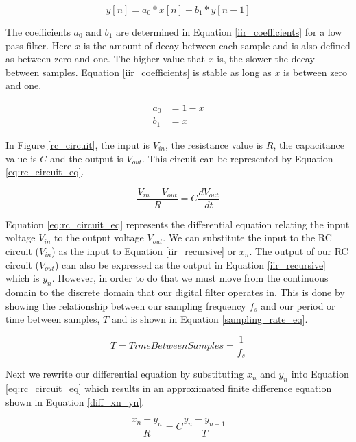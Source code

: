 \begin{equation}\label{iir_recursive}
y[n] = a_0 * x[n] + b_1 * y[n-1]
\end{equation}

The coefficients $a_0$ and $b_1$ are determined in Equation \ref{iir_coefficients} for a low pass filter.  Here $x$ is the amount of decay between each sample and is also defined as between zero and one.  The higher value that $x$ is, the slower the decay between samples.  Equation \ref{iir_coefficients} is stable as long as $x$ is between zero and one.

\begin{align}\label{iir_coefficients}
a_0 &= 1 - x \\
b_1 &= x
\end{align}

In Figure \ref{rc_circuit}, the input is $V_{in}$, the resistance value is $R$, the capacitance value is $C$ and the output is $V_{out}$.  This circuit can be represented by Equation \ref{eq:rc_circuit_eq}.

\begin{equation}\label{eq:rc_circuit_eq}
\frac{V_{in}-V_{out}}{R}=C\frac{dV_{out}}{dt}
\end{equation}

Equation \ref{eq:rc_circuit_eq} represents the differential equation relating the input voltage $V_{in}$ to the output voltage $V_{out}$.  We can substitute the input to the RC circuit ($V_{in}$) as the input to Equation \ref{iir_recursive} or $x_n$.  The output of our RC circuit ($V_{out}$) can also be expressed as the output in Equation \ref{iir_recursive} which is $y_n$.  However, in order to do that we must move from the continuous domain to the discrete domain that our digital filter operates in.  This is done by showing the relationship between our sampling frequency $f_s$ and our period or time between samples, $T$ and is shown in Equation \ref{sampling_rate_eq}.

\begin{equation}\label{sampling_rate_eq}
T=Time Between Samples=\frac{1}{f_s}
\end{equation}

Next we rewrite our differential equation by substituting $x_n$ and $y_n$ into Equation \ref{eq:rc_circuit_eq} which results in an approximated finite difference equation shown in Equation \ref{diff_xn_yn}.

\begin{equation}\label{diff_xn_yn}
\frac{x_n-y_n}{R}=C\frac{y_n-y_{n-1}}{T}
\end{equation}

